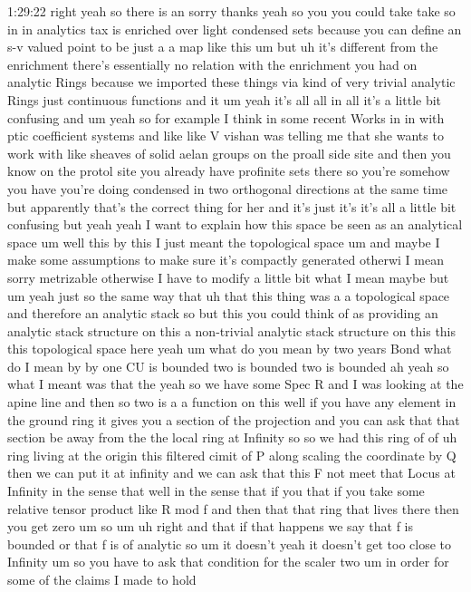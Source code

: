 \begin{unfinished}{1:29:22}
right yeah so there is an sorry thanks
yeah so you you could take take so in in
analytics tax is enriched over light
condensed sets because you can define an
s-v valued point to be just a a map like
this um but uh it's different from the
enrichment there's essentially no
relation with the enrichment you had on
analytic Rings because we imported these
things via kind of very trivial analytic
Rings just continuous functions and it
um yeah it's all all in all it's a
little bit confusing and um yeah so for
example I think in some recent Works
in in with ptic coefficient systems and
like like V vishan was telling me that
she wants to work with like sheaves of
solid aelan groups on the proall side
site and then you know on the protol
site you already have profinite sets
there so you're somehow you have you're
doing condensed in two orthogonal
directions at the same time but
apparently that's the correct thing for
her and it's just it's it's all a little
bit confusing
but
yeah
yeah I want to explain how this space be
seen as an analytical space um well this
by this I just meant the topological
space um and maybe I make some
assumptions to make sure it's compactly
generated otherwi I mean sorry
metrizable otherwise I have to modify a
little bit what I mean maybe but um yeah
just so the same way that uh that this
thing was a a topological space and
therefore an analytic stack so but this
you could think of as providing an
analytic stack structure on this a
non-trivial analytic stack structure on
this this this topological space
here
yeah um what do you mean by two years
Bond what do I mean by by
one CU is
bounded two is bounded two is bounded ah
yeah so what I meant was that the yeah
so we have some Spec
R and I was looking at the apine line
and then so two is a a function on this
well if you have any element in the
ground ring it gives you a section of
the projection and you can ask that that
section be away from the the local ring
at Infinity so so we had this ring of of
uh ring living at the origin this
filtered cimit of P along scaling the
coordinate by Q then we can put it at
infinity and we can ask that this F not
meet that Locus at Infinity in the sense
that well in the sense that if
you that if you take some relative
tensor product like R mod f and then
that that ring that lives there then you
get zero um
so
um uh right and that if that happens we
say that f is bounded or that f is of
analytic so um it doesn't yeah it
doesn't get too close to
Infinity um so you have to ask that
condition for the scaler two um in order
for some of the claims I made to hold

\end{unfinished}

